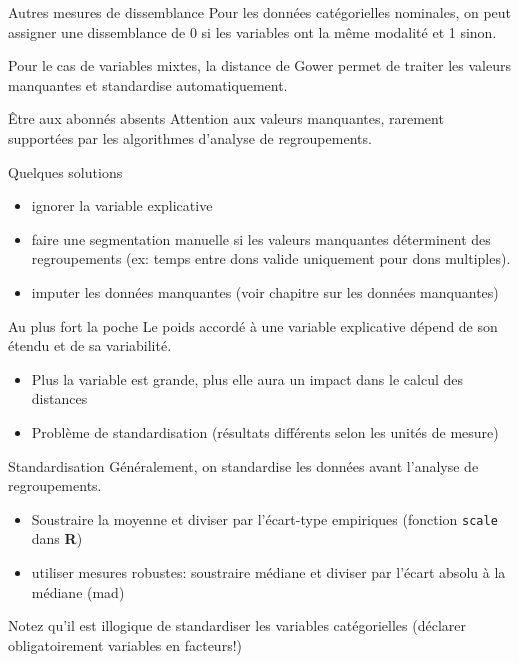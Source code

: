 \documentclass[
  ignorenonframetext,
]{beamer}
\providecommand{\tightlist}{%
  \setlength{\itemsep}{0pt}\setlength{\parskip}{0pt}}\usepackage{longtable,booktabs,array}
\begin{document}
\begin{frame}{Autres mesures de dissemblance}
\protect\hypertarget{autres-mesures-de-dissemblance-1}{}
Pour les données catégorielles nominales, on peut assigner une
dissemblance de 0 si les variables ont la même modalité et 1 sinon.

Pour le cas de variables mixtes, la distance de Gower permet de traiter
les valeurs manquantes et standardise automatiquement.
\end{frame}

\begin{frame}{Être aux abonnés absents}
\protect\hypertarget{uxeatre-aux-abonnuxe9s-absents}{}
Attention aux valeurs manquantes, rarement supportées par les
algorithmes d'analyse de regroupements.

Quelques solutions

\begin{itemize}
\tightlist
\item
  ignorer la variable explicative
\item
  faire une segmentation manuelle si les valeurs manquantes déterminent
  des regroupements (ex: temps entre dons valide uniquement pour dons
  multiples).
\item
  imputer les données manquantes (voir chapitre sur les données
  manquantes)
\end{itemize}
\end{frame}

\begin{frame}{Au plus fort la poche}
\protect\hypertarget{au-plus-fort-la-poche}{}
Le poids accordé à une variable explicative dépend de son étendu et de
sa variabilité.

\begin{itemize}
\tightlist
\item
  Plus la variable est grande, plus elle aura un impact dans le calcul
  des distances
\item
  Problème de standardisation (résultats différents selon les unités de
  mesure)
\end{itemize}
\end{frame}

\begin{frame}[fragile]{Standardisation}
\protect\hypertarget{standardisation}{}
Généralement, on standardise les données avant l'analyse de
regroupements.

\begin{itemize}
\tightlist
\item
  Soustraire la moyenne et diviser par l'écart-type empiriques (fonction
  \texttt{scale} dans \textbf{R})
\item
  utiliser mesures robustes: soustraire médiane et diviser par l'écart
  absolu à la médiane (mad)
\end{itemize}

Notez qu'il est illogique de standardiser les variables catégorielles
(déclarer obligatoirement variables en facteurs!)
\end{frame}
\end{document}
